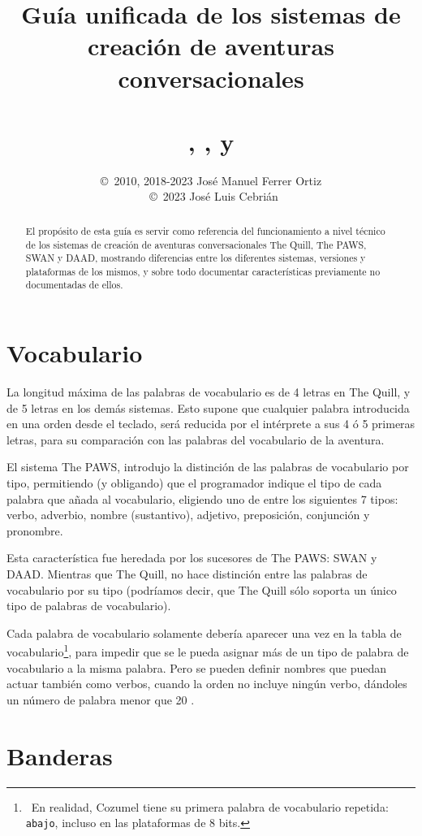 \documentclass[11pt, a5paper]{article}
\title{Guía unificada de los sistemas de creación de aventuras conversacionales
       \\\ \\\Huge{\quill, \paw, \swan y \daad}}
\author{\copyright\ 2010, 2018-2023 José Manuel Ferrer Ortiz
       \\\ \copyright\ 2023 José Luis Cebrián}
\newcommand{\quill}{\textsf{The Quill}\xspace}
\newcommand{\paw}{\textsf{The PAWS}\xspace}
\newcommand{\swan}{\textsf{SWAN}\xspace}
\newcommand{\daad}{\textsf{DAAD}\xspace}
\begin{document}
\maketitle
\tableofcontents
\newpage

\begin{abstract}
El propósito de esta guía es servir como referencia del funcionamiento a nivel técnico de los sistemas de creación de aventuras conversacionales \quill, \paw, \swan y \daad, mostrando diferencias entre los diferentes sistemas, versiones y plataformas de los mismos, y sobre todo documentar características previamente no documentadas de ellos.
\end{abstract}

\section{Vocabulario}

La longitud máxima de las palabras de vocabulario es de 4 letras en \quill, y de 5 letras en los demás sistemas. Esto supone que cualquier palabra introducida en una orden desde el teclado, será reducida por el intérprete a sus 4 ó 5 primeras letras, para su comparación con las palabras del vocabulario de la aventura.

El sistema \paw, introdujo la distinción de las palabras de vocabulario por tipo, permitiendo (y obligando) que el programador indique el tipo de cada palabra que añada al vocabulario, eligiendo uno de entre los siguientes 7 tipos: verbo, adverbio, nombre (sustantivo), adjetivo, preposición, conjunción y pronombre.

Esta característica fue heredada por los sucesores de \paw: \swan y \daad. Mientras que \quill, no hace distinción entre las palabras de vocabulario por su tipo (podríamos decir, que \quill sólo soporta un único tipo de palabras de vocabulario).

Cada palabra de vocabulario solamente debería aparecer una vez en la tabla de vocabulario\footnote{\ En realidad, Cozumel tiene su primera palabra de vocabulario repetida: \texttt{abajo}, incluso en las plataformas de 8 bits.}, para impedir que se le pueda asignar más de un tipo de palabra de vocabulario a la misma palabra. Pero se pueden definir nombres que puedan actuar también como verbos, cuando la orden no incluye ningún verbo, dándoles un número de palabra menor que 20 \cite[sección VOC]{PawsPC}.


\section{Banderas}
\end{document}
